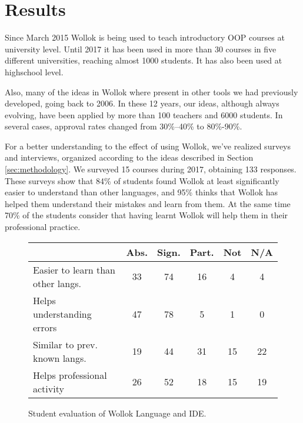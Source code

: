 \section{Results}
\label{sec:results}
Since March 2015 Wollok is being used to teach introductory OOP courses at university level.
Until 2017 it has been used in more than 30 courses in five different universities, reaching almost 1000 students.
It has also been used at highschool level.

Also, many of the ideas in Wollok where present in other tools we had previously developed, going back to 2006. 
In these 12 years, our ideas, although always evolving, have been applied by more than 100 teachers and 6000 students. 
In several cases, approval rates changed from 30\%--40\% to 80\%-90\%.

\medskip
For a better understanding to the effect of using Wollok, we've realized surveys and interviews, organized according to the ideas described in Section \ref{sec:methodology}.
We surveyed 15 courses during 2017, obtaining 133 responses.
These surveys show that 84\% of students found Wollok at least significantly easier to understand than other languages,
and 95\% thinks that Wollok has helped them understand their mistakes and learn from them.
At the same time 70\% of the students consider that having learnt Wollok will help them in their professional practice.

\begin{figure}[ht]
 \centering
 \footnotesize
 \begin{tabular}{|p{13em}|c|c|c|c|c|}
 	\hline
 	& Abs. & Sign. & Part. & Not & N/A \\
 	\hline
 	Easier to learn than other langs. & 33 & 74 & 16 & 4 & 4 \\
 	Helps understanding errors & 47 & 78 & 5 & 1 & 0 \\
 	Similar to prev. known langs. & 19 & 44 & 31 & 15 & 22 \\
 	Helps professional activity & 26 & 52 & 18 & 15 & 19 \\
 	\hline
 
 \end{tabular}

 \caption{\small Student evaluation of Wollok Language and IDE.}
\label{fig:helloWorld/wollok}
\end{figure}



